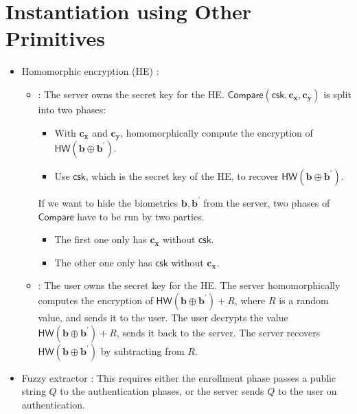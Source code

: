 
\newpage


\section{Instantiation using Other Primitives}

\begin{itemize}
	\item Homomorphic encryption (HE) \cite{10.1007/978-3-642-01957-9_7, 10.1007/978-3-642-40588-4_5, pradel2021privacypreservingbiometricmatchingusing}:
	\begin{itemize}
		\item \cite{10.1007/978-3-642-40588-4_5}: The server owns the secret key for the HE. $\textsf{Compare}(\textsf{csk}, \mathbf{c_x}, \mathbf{c_y})$ is split into two phases:
			\begin{itemize}
				\item With $\mathbf{c_x}$ and $\mathbf{c_y}$, homomorphically compute the encryption of $\textsf{HW}(\mathbf{b} \oplus \mathbf{b}^\prime)$.
				\item Use $\textsf{csk}$, which is the secret key of the HE, to recover $\textsf{HW}(\mathbf{b} \oplus \mathbf{b}^\prime)$.
			\end{itemize}
			If we want to hide the biometrics $\mathbf{b}, \mathbf{b}^\prime$ from the server, two phases of $\textsf{Compare}$ have to be run by two parties.
			\begin{itemize}
				\item The first one only has $\mathbf{c_x}$ without $\textsf{csk}$.
				\item The other one only has $\textsf{csk}$ without $\mathbf{c_x}$.
			\end{itemize}
		\item \cite{10.1007/978-3-642-01957-9_7, pradel2021privacypreservingbiometricmatchingusing}: The user owns the secret key for the HE. The server homomorphically computes the encryption of $\textsf{HW}(\mathbf{b} \oplus \mathbf{b}^\prime) + R$, where $R$ is a random value, and sends it to the user. The user decrypts the value $\textsf{HW}(\mathbf{b} \oplus \mathbf{b}^\prime) + R$, sends it back to the server. The server recovers $\textsf{HW}(\mathbf{b} \oplus \mathbf{b}^\prime)$ by subtracting from $R$.

	\end{itemize}

	\item Fuzzy extractor \cite{10.1145/1030083.1030096, 7980010}: This requires either the enrollment phase passes a public string $Q$ to the authentication phases, or the server sends $Q$ to the user on authentication.


\end{itemize}

